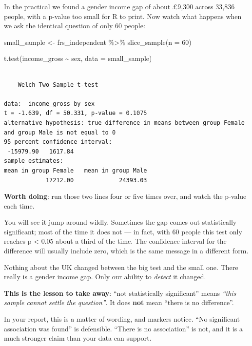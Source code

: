 \documentclass[
  letterpaper,
  DIV=11,
  numbers=noendperiod]{scrreprt}
\newenvironment{Shaded}{\begin{snugshade}}{\end{snugshade}}
\newcommand{\AttributeTok}[1]{\textcolor[rgb]{0.40,0.45,0.13}{#1}}
\newcommand{\DecValTok}[1]{\textcolor[rgb]{0.68,0.00,0.00}{#1}}
\newcommand{\FunctionTok}[1]{\textcolor[rgb]{0.28,0.35,0.67}{#1}}
\newcommand{\NormalTok}[1]{\textcolor[rgb]{0.00,0.23,0.31}{#1}}
\newcommand{\OtherTok}[1]{\textcolor[rgb]{0.00,0.23,0.31}{#1}}
\newcommand{\SpecialCharTok}[1]{\textcolor[rgb]{0.37,0.37,0.37}{#1}}
\begin{document}

In the practical we found a gender income gap of about £9,300 across
33,836 people, with a p-value too small for R to print. Now watch what
happens when we ask the identical question of only 60 people:

\begin{Shaded}
\begin{Highlighting}[]
\NormalTok{small\_sample }\OtherTok{\textless{}{-}}\NormalTok{ frs\_independent }\SpecialCharTok{\%\textgreater{}\%} \FunctionTok{slice\_sample}\NormalTok{(}\AttributeTok{n =} \DecValTok{60}\NormalTok{)}

\FunctionTok{t.test}\NormalTok{(income\_gross }\SpecialCharTok{\textasciitilde{}}\NormalTok{ sex, }\AttributeTok{data =}\NormalTok{ small\_sample)}
\end{Highlighting}
\end{Shaded}

\begin{verbatim}

    Welch Two Sample t-test

data:  income_gross by sex
t = -1.639, df = 50.331, p-value = 0.1075
alternative hypothesis: true difference in means between group Female and group Male is not equal to 0
95 percent confidence interval:
 -15979.90   1617.84
sample estimates:
mean in group Female   mean in group Male 
            17212.00             24393.03 
\end{verbatim}

\textbf{Worth doing}: run those two lines four or five times over, and
watch the p-value each time.

You will see it jump around wildly. Sometimes the gap comes out
statistically significant; most of the time it does not --- in fact,
with 60 people this test only reaches p \textless{} 0.05 about a third
of the time. The confidence interval for the difference will usually
include zero, which is the same message in a different form.

Nothing about the UK changed between the big test and the small one.
There really is a gender income gap. Only our ability to \emph{detect}
it changed.

\textbf{This is the lesson to take away}: ``not statistically
significant'' means \emph{``this sample cannot settle the question''}.
It does \textbf{not} mean ``there is no difference''.

In your report, this is a matter of wording, and markers notice. ``No
significant association was found'' is defensible. ``There is no
association'' is not, and it is a much stronger claim than your data can
support.
\end{document}

